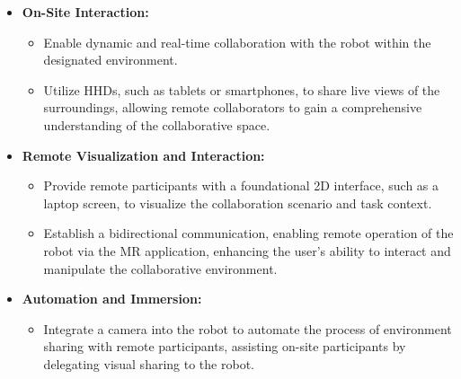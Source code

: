 \begin{itemize}
    \item \textbf{On-Site Interaction:}
    \begin{itemize}
        \item Enable dynamic and real-time collaboration with the robot within the designated environment.
        \item Utilize \ac{HHDs}, such as tablets or smartphones, to share live views of the surroundings, allowing remote collaborators 
        to gain a comprehensive understanding of the collaborative space.
    \end{itemize}
    \item \textbf{Remote Visualization and Interaction:}
    \begin{itemize}
        \item Provide remote participants with a foundational 2D interface, such as a laptop screen, to visualize the collaboration scenario and 
        task context.
        \item Establish a bidirectional communication, enabling remote operation of the robot via the \ac{MR} application, enhancing the user's ability to interact and manipulate the collaborative environment.
    \end{itemize}
    \item \textbf{Automation and Immersion:}
    \begin{itemize}
        \item Integrate a camera into the robot to automate the process of environment sharing with remote participants, assisting on-site participants 
        by delegating visual sharing to the robot.
    \end{itemize}
\end{itemize}

